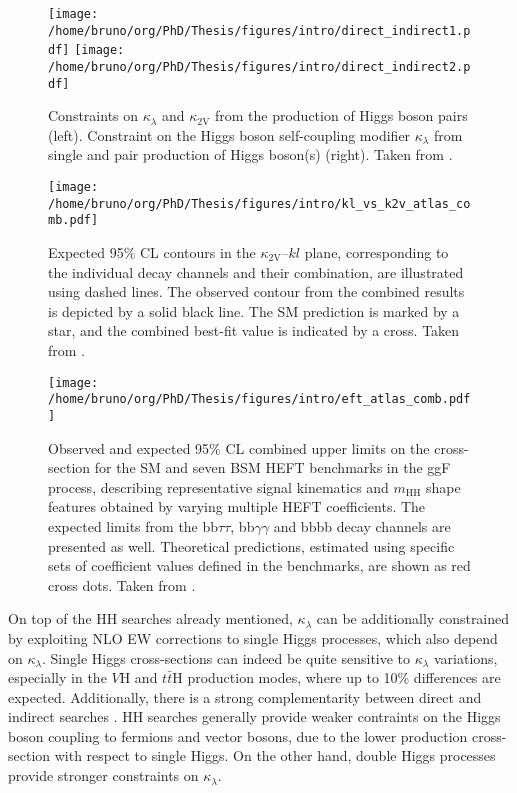 \documentclass[11pt]{article}
\newcommand{\bbbb}{bbbb}
\newcommand{\bbgg}{bb$\gamma\gamma$}
\newcommand{\bbtt}{bb$\tau\tau$}
\newcommand{\kl}{\kappa_{\lambda}}
\newcommand{\kvv}{\kappa_{\text{2V}}}
\newcommand{\mhh}{m_{\text{HH}}}
\newcommand{\tth}{$t\bar{t}\text{H}$}
\newcommand{\vh}{$V\text{H}$}
\begin{document}
\begin{figure}
\texttt{[image: /home/bruno/org/PhD/Thesis/figures/intro/direct\_indirect1.pdf]}
\texttt{[image: /home/bruno/org/PhD/Thesis/figures/intro/direct\_indirect2.pdf]}
\caption{\label{fig:direct_vs_indirect_cms}Constraints on \(\kl\) and \(\kvv\) from the production of Higgs boson pairs (left). Constraint on the Higgs boson self-coupling modifier \(\kl\) from single and pair production of Higgs boson(s) (right). Taken from \cite{higgs_10_years}.}
\end{figure}

\begin{figure}
\texttt{[image: /home/bruno/org/PhD/Thesis/figures/intro/kl\_vs\_k2v\_atlas\_comb.pdf]}
\caption{\label{fig:kl_vs_k2v_atlas}Expected 95\% CL contours in the \(\kvv{}–kl{}\) plane, corresponding to the individual decay channels and their combination, are illustrated using dashed lines. The observed contour from the combined results is depicted by a solid black line. The \ac{SM} prediction is marked by a star, and the combined best-fit value is indicated by a cross. Taken from \cite{atlas_hh_comb}.}
\end{figure}

\begin{figure}
\texttt{[image: /home/bruno/org/PhD/Thesis/figures/intro/eft\_atlas\_comb.pdf]}
\caption{\label{fig:kl_vs_k2v_atlas}Observed and expected 95\% CL combined upper limits on the cross-section for the \ac{SM} and seven \ac{BSM} HEFT benchmarks in the ggF process, describing representative signal kinematics and \(\mhh\) shape features obtained by varying multiple \ac{HEFT} coefficients. The expected limits from the \bbtt{}, \bbgg{} and \bbbb{} decay channels are presented as well. Theoretical predictions, estimated using specific sets of coefficient values defined in the benchmarks, are shown as red cross dots. Taken from \cite{atlas_hh_comb}.}
\end{figure}



On top of the HH searches already mentioned, \(\kl\) can be additionally constrained by exploiting \ac{NLO} \ac{EW} corrections to single Higgs processes, which also depend on \(\kl\).
Single Higgs cross-sections can indeed be quite sensitive to \(\kl\) variations, especially in the \vh{} and \tth{} production modes, where up to 10\% differences are expected.
Additionally, there is a strong complementarity between direct and indirect searches \cite{indirect_searches2}.
HH searches generally provide weaker contraints on the Higgs boson coupling to fermions and vector bosons, due to the lower production cross-section with respect to single Higgs.
On the other hand, double Higgs processes provide stronger constraints on \(\kl\).
\end{document}
